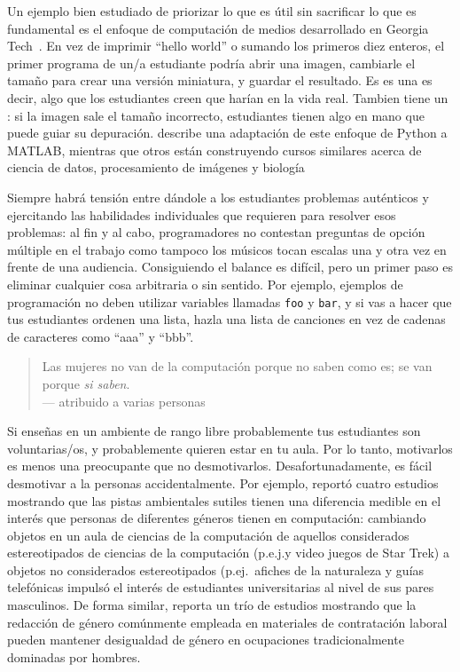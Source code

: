 Un ejemplo bien estudiado de priorizar lo que es útil
sin sacrificar lo que es fundamental
es el enfoque de computación de medios desarrollado en Georgia Tech~\cite{Guzd2013}.
En vez de imprimir ``hello world'' o sumando los primeros diez enteros,
el primer programa de un/a estudiante podría abrir una imagen,
cambiarle el tamaño para crear una versión miniatura,
y guardar el resultado.
Es es una 
es decir, algo que los estudiantes creen que harían en la vida real.
Tambien tiene un :
si la imagen sale el tamaño incorrecto,
estudiantes tienen algo en mano que puede guiar su depuración.
\cite{Lee2013} describe una adaptación de este enfoque de Python a MATLAB,
mientras que otros están construyendo cursos similares acerca de ciencia de datos, procesamiento de imágenes
y biología~\cite{Dahl2018,Meys2018,Ritz2018}

Siempre habrá tensión entre dándole a los estudiantes problemas auténticos
y ejercitando las habilidades individuales que requieren para resolver esos problemas:
al fin y al cabo,
programadores no contestan preguntas de opción múltiple en el trabajo
como tampoco los músicos tocan escalas una y otra vez en frente de una audiencia.
Consiguiendo el balance es difícil,
pero un primer paso es eliminar cualquier cosa arbitraria o sin sentido.
Por ejemplo,
ejemplos de programación no deben utilizar variables llamadas \texttt{foo} y \texttt{bar},
y si vas a hacer que tus estudiantes ordenen una lista,
hazla una lista de canciones en vez de cadenas de caracteres como ``aaa'' y ``bbb''.


\begin{quote}

  Las mujeres no van de la computación porque no saben como es;
  se van porque \emph{si saben}. \\
  --- atribuido a varias personas

\end{quote}

Si enseñas en un ambiente de rango libre
probablemente tus estudiantes son voluntarias/os,
y probablemente quieren estar en tu aula.
Por lo tanto, motivarlos es menos una preocupante que no desmotivarlos.
Desafortunadamente,
es fácil desmotivar a la personas accidentalmente.
Por ejemplo,
\cite{Cher2009} reportó cuatro estudios mostrando que
las pistas ambientales sutiles tienen una diferencia medible en el interés que personas de diferentes géneros tienen en computación:
cambiando objetos en un aula de ciencias de la computación de aquellos considerados estereotipados de ciencias de la computación
(p.e.j.\afiches y video juegos de Star Trek)
a objetos no considerados estereotipados (p.ej.\ afiches de la naturaleza y guías telefónicas
impulsó el interés de estudiantes universitarias al nivel de sus pares masculinos.
De forma similar, 
\cite{Gauc2011} reporta un trío de estudios mostrando que
la redacción de género comúnmente empleada en materiales de contratación laboral 
pueden mantener desigualdad de género en ocupaciones tradicionalmente dominadas por hombres.

